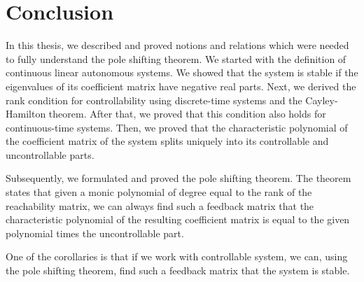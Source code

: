 \chapter*{Conclusion}

In this thesis, we described and proved notions and relations which were needed to fully understand the pole shifting theorem. We started with the definition of continuous linear autonomous systems. We showed that the system is stable if the eigenvalues of its coefficient matrix have negative real parts.
Next, we derived the rank condition for controllability using discrete-time systems and the Cayley-Hamilton theorem. After that, we proved that this condition also holds for continuous-time systems. Then, we proved that the characteristic polynomial of the coefficient matrix of the system splits uniquely into its controllable and uncontrollable parts. 

Subsequently, we formulated and proved the pole shifting theorem. The theorem states that given a monic polynomial of degree equal to the rank of the reachability matrix, we can always find such a feedback matrix that the characteristic polynomial of the resulting coefficient matrix is equal to the given polynomial times the uncontrollable part.

One of the corollaries is that if we work with controllable system, we can, using the pole shifting theorem, find such a feedback matrix that the system is stable. 
